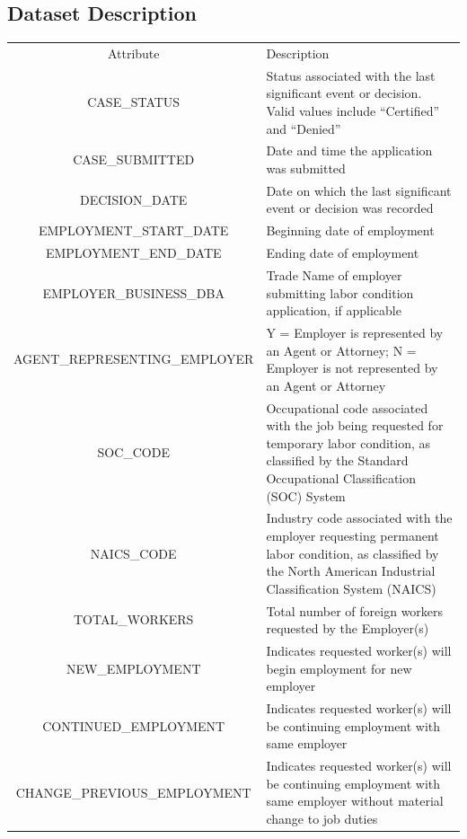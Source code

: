 \begin{appendices}
\section{Dataset Description}
\label{appendix: table}

\begin{table}[h]
\label{tab:raw dataset}       %
\begin{tabularx}{\textwidth}{|c|X|}
\hline\noalign{\smallskip}
Attribute & Description \\
\noalign{\smallskip}\hline\noalign{\smallskip}
CASE\_STATUS & Status associated with the last significant event or decision. Valid values include “Certified” and “Denied” \\\hline
CASE\_SUBMITTED & Date and time the application was submitted\\\hline
DECISION\_DATE & Date on which the last significant event or decision was recorded\\\hline
EMPLOYMENT\_START\_DATE & Beginning date of employment\\\hline
EMPLOYMENT\_END\_DATE & Ending date of employment\\\hline
EMPLOYER\_BUSINESS\_DBA & Trade Name of employer submitting labor condition application, if applicable\\\hline
AGENT\_REPRESENTING\_EMPLOYER & Y = Employer is represented by an Agent or Attorney; N = Employer is not represented by an Agent or Attorney\\\hline
SOC\_CODE & Occupational code associated with the job being requested for temporary labor condition, as classified by the Standard Occupational Classification (SOC) System\\\hline
NAICS\_CODE & Industry code associated with the employer requesting permanent labor condition, as classified by the North American Industrial Classification System (NAICS)\\\hline
TOTAL\_WORKERS & Total number of foreign workers requested by the Employer(s)\\\hline
NEW\_EMPLOYMENT & Indicates requested worker(s) will begin employment for new employer\\\hline
CONTINUED\_EMPLOYMENT & Indicates requested worker(s) will be continuing employment with same employer\\\hline
CHANGE\_PREVIOUS\_EMPLOYMENT & Indicates requested worker(s) will be continuing employment with same employer without material change to job duties\\\hline

\end{tabularx}
\end{table}
\end{appendices}
